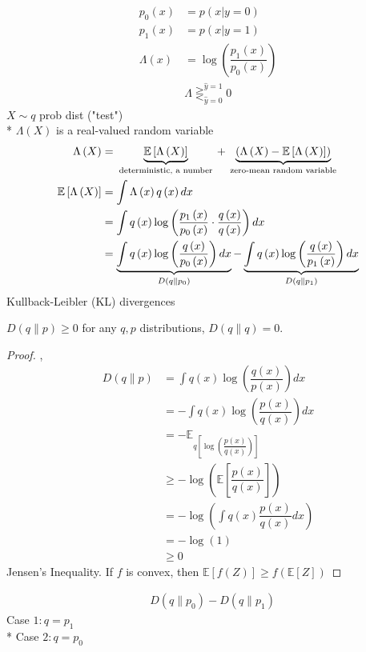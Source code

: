 \documentclass{article}
\begin{document}
\begin{align*}
p_{0}\left(x\right) &= p\left(x | y = 0\right)
\\ p_{1}\left(x\right) &= p\left(x | y = 1\right)
\\ \Lambda\left(x\right) &= \log\left(\dfrac{p_{1}\left(x\right)}{p_{0}\left(x\right)}\right)
\\ &\Lambda \gtreqless^{\hat{y} = 1}_{\hat{y} = 0} 0
\end{align*}
$X  \sim  q $ prob dist ("test")
\\* $\Lambda\left(X\right)$ is a real-valued random variable
\begin{align*}
\Lambda\left(X\right) &= \underbrace{\mathbb{E}\left[\Lambda\left(X\right)\right]}_{\text{\;deterministic, a number\;}} + \underbrace{\left(\Lambda\left(X\right) - \mathbb{E}\left[\Lambda\left(X\right)\right]\right)}_{\text{\;zero-mean random variable\;}}
\\ \mathbb{E}\left[\Lambda\left(X\right)\right] &= \displaystyle\int \Lambda\left(x\right) q\left(x\right) dx
\\ &= \displaystyle\int q\left(x\right) \log\left(\dfrac{p_{1}\left(x\right)}{p_{0}\left(x\right)} \cdot  \dfrac{q\left(x\right)}{q\left(x\right)}\right) dx
\\ &= \underbrace{\displaystyle\int q\left(x\right) \log\left(\dfrac{q\left(x\right)}{p_{0}\left(x\right)}\right) dx}_{D\left(q \| p_{0}\right)} - \underbrace{\displaystyle\int q\left(x\right) \log\left(\dfrac{q\left(x\right)}{p_{1}\left(x\right)}\right) dx}_{D\left(q \| p_{1}\right)}
\end{align*}
Kullback-Leibler (KL) divergences
\begin{lem} \label{lem:kl} 
$D\left(q \| p\right)  \geq  0$ for any $q , p $ distributions, $D\left(q \| q\right)  = 0$.
\end{lem}
\begin{proof} \label{proof:kl} 
,
\begin{align*}
D\left(q \| p\right)  &= \displaystyle\int q\left(x\right) \log\left(\dfrac{q\left(x\right)}{p\left(x\right)}\right) dx
\\ &= - \displaystyle\int q\left(x\right) \log\left(\dfrac{p\left(x\right)}{q\left(x\right)}\right) dx
\\ &= - \mathbb{E}_{q\left[\log\left(\dfrac{p\left(x\right)}{q\left(x\right)}\right)\right]}
\\ &\geq  - \log\left(\mathbb{E}\left[\dfrac{p\left(x\right)}{q\left(x\right)}\right]\right)
\\ &= - \log\left(\displaystyle\int q\left(x\right) \dfrac{p\left(x\right)}{q\left(x\right)} dx\right)
\\ &= - \log\left(1\right)
\\ &\geq  0
\end{align*}
Jensen's Inequality. If $f $ is convex, then $\mathbb{E}\left[f\left(Z\right)\right] \geq  f\left(\mathbb{E}\left[Z\right]\right)$
\end{proof}
\begin{align*}
&D\left(q \| p_{0}\right)  - D\left(q \| p_{1}\right)
\end{align*}
Case $1: q  = p_{1}$
\\* Case $2: q  = p_{0}$
\end{document}
